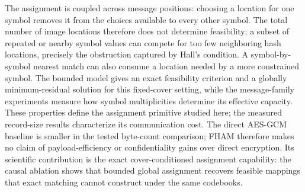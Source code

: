 \documentclass[preprint,12pt]{elsarticle}
\theoremstyle{plain}
\begin{document}
The assignment is coupled across message positions: choosing a location for one
symbol removes it from the choices available to every other symbol. The total
number of image locations therefore does not determine feasibility; a subset
of repeated or nearby symbol values can compete for too few neighboring hash
locations, precisely the obstruction captured by Hall's condition. A
symbol-by-symbol nearest match can also consume a location needed by a more
constrained symbol. The bounded model gives an exact feasibility criterion and
a globally minimum-residual solution for this fixed-cover setting, while the
message-family experiments measure how symbol multiplicities determine its
effective capacity. These properties define the assignment primitive studied
here; the measured record-size results characterize its communication cost.
The direct AES-GCM baseline is smaller in the tested byte-count comparison;
FHAM therefore makes no claim of payload-efficiency or confidentiality gains
over direct encryption. Its scientific contribution is the exact
cover-conditioned assignment capability: the causal ablation shows that
bounded global assignment recovers feasible mappings that exact matching
cannot construct under the same codebooks.
\end{document}
